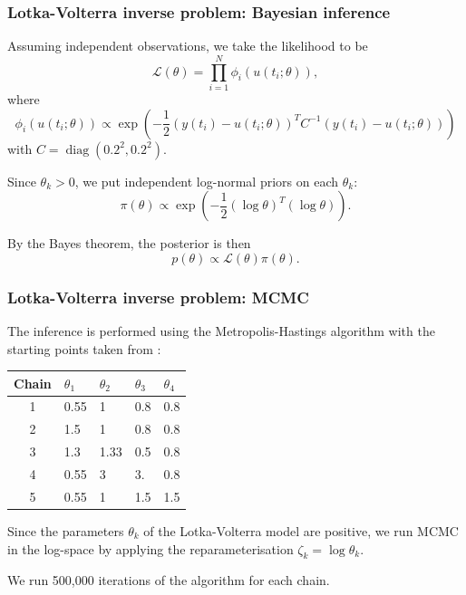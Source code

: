 \documentclass{beamer}
\DeclareMathOperator{\diag}{diag}
\begin{document}
\begin{frame}
\frametitle{Lotka-Volterra inverse problem: Bayesian inference}

Assuming independent observations, we take the likelihood to be
\begin{equation*}
\mathcal{L}(\theta) = \prod_{i=1}^N \phi_i(u(t_i; \theta)),
\end{equation*}
where 
\begin{equation*}
\phi_i(u(t_i;\theta)) \propto \exp\left( -\frac{1}{2} (y(t_i) - u(t_i; \theta))^T C^{-1} (y(t_i) - u(t_i; \theta)) \right)
\end{equation*}
with $C = \diag(0.2^2, 0.2^2)$.

Since $\theta_k > 0$, we put independent log-normal priors on each $\theta_k$:
\begin{equation*}
\pi(\theta) \propto \exp \left(-\frac{1}{2} (\log \theta)^T (\log \theta) \right).
\end{equation*}

By the Bayes theorem, the posterior is then
\begin{equation*}
p(\theta) \propto \mathcal{L}(\theta) \pi(\theta).
\end{equation*}

\end{frame}

\begin{frame}
\frametitle{Lotka-Volterra inverse problem: MCMC}

The inference is performed using the Metropolis-Hastings algorithm with the starting points taken from \cite{riabizOptimalThinningMCMC2022}:

\begin{table}[H]
\centering
\begin{tabularx}{0.5\textwidth}{c Y Y Y Y} 
 \hline
 Chain & $\theta_1$ & $\theta_2$ & $\theta_3$ & $\theta_4$ \\
  & 0.55 & 1    & 0.8 & 0.8 \\ 
 2 & 1.5  & 1    & 0.8 & 0.8 \\
 3 & 1.3  & 1.33 & 0.5 & 0.8 \\
 4 & 0.55 & 3    & 3.  & 0.8 \\
 5 & 0.55 & 1    & 1.5 & 1.5 \\
 \hline
\end{tabularx}
\end{table}

Since the parameters $\theta_k$ of the Lotka-Volterra model are positive, we run MCMC in the log-space by applying the reparameterisation $\zeta_k = \log \theta_k$. 

We run 500,000 iterations of the algorithm for each chain.

\end{frame}
\end{document}
